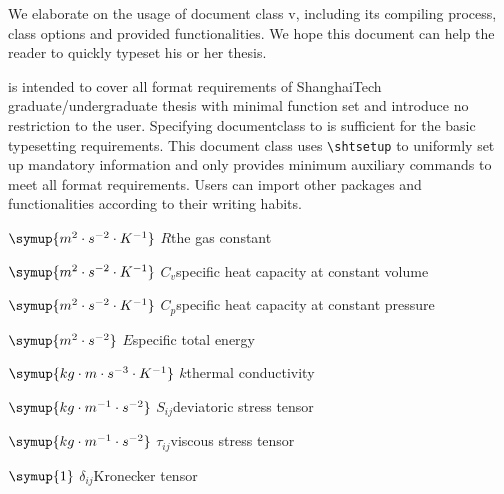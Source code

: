 \documentclass[master]{shtthesis}
\makeatletter
\def\ifgraduate{\ifsht@graduate}
\makeatother
\begin{document}
\maketitle

\frontmatter
\begin{abstract}[flattitle]
  本文档阐述 \shtthesis{} v\version{} 的使用方法，包括其编译方式、文档类选项以及提供的功能。希望能够帮助读者快速便捷地完成学位论文排版。

  \shtthesis{} 旨在以最简实现和最小依赖完整覆盖上海科技大学本科及研究生学位论文的所有格式要求，且不为用户额外设限。使用时仅需指定 documentclass 为 \shtthesis{} 即可满足基本排版要求。文档通过 \verb|\shtsetup| 命令统一设定学位论文信息，且仅提供满足格式需求的最少额外命令以保证兼容性。用户可根据自身撰文习惯，引入额外的宏包和命令完成学位论文撰写。
\end{abstract}

\begin{abstract*}[flattitle]
  We elaborate on the usage of document class \shtthesis{} v\version{}, including its compiling process, class options and provided functionalities. We hope this document can help the reader to quickly typeset his or her thesis. 

  \shtthesis{} is intended to cover all format requirements of ShanghaiTech graduate/undergraduate thesis with minimal function set and introduce no restriction to the user. Specifying documentclass to \shtthesis{} is suﬀicient for the basic typesetting requirements. This document class uses \verb|\shtsetup| to uniformly set up mandatory information and only provides minimum auxiliary commands to meet all format requirements. Users can import other packages and functionalities according to their writing habits. 
\end{abstract*}

\makeindices

\ifgraduate
\begin{nomenclatures}
  \item[$\symup{{m^{2} \cdot s^{-2} \cdot K^{-1}}}$]{$R$}{the gas constant}
  \item[$\symup{{m^{2} \cdot s^{-2} \cdot K^{-1}}}$]{$C_v$}{specific heat capacity at constant volume}
  \item[$\symup{{m^{2} \cdot s^{-2} \cdot K^{-1}}}$]{$C_p$}{specific heat capacity at constant pressure}
  \item[$\symup{{m^{2} \cdot s^{-2}}}$]{$E$}{specific total energy}
  \item[$\symup{{kg \cdot m \cdot s^{-3} \cdot K^{-1}}}$]{$k$}{thermal conductivity}
  \item[$\symup{{kg \cdot m^{-1} \cdot s^{-2}}}$]{$S_{ij}$}{deviatoric stress tensor}
  \item[$\symup{{kg \cdot m^{-1} \cdot s^{-2}}}$]{$\tau_{ij}$}{viscous stress tensor}
  \item[$\symup{{1}}$]{$\delta_{ij}$}{Kronecker tensor}
\end{nomenclatures}
\end{document}
